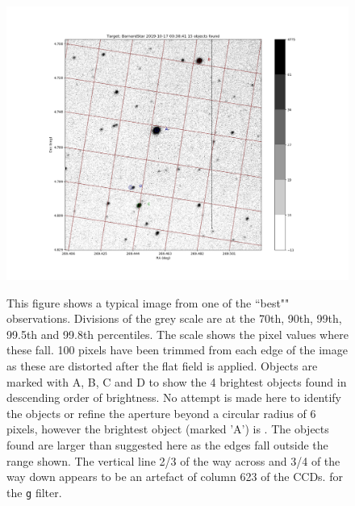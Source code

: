 \begin{figure}[!htbp]
\begin{center}
\includegraphics[scale=0.5]{images/gooddisp.png} \\
\end{center}   
\caption{This figure shows a typical image from one of the ``best"" {\bstar}
observations. Divisions of the grey scale are at the 70th, 90th, 99th, 99.5th
and 99.8th percentiles. The scale shows the pixel values where these fall.
100 pixels have been trimmed from each edge of the image as these are distorted
after the flat field is applied.
Objects are marked with A, B, C and D to show the 4 brightest objects found in descending order of
brightness. No attempt is made here to identify the objects or refine the
aperture beyond a circular radius of 6 pixels, however the brightest object
(marked 'A') is \bstar.
The objects found are larger than suggested here as the edges fall
outside the range shown.
The vertical line 2/3 of the way across and 3/4 of the way down appears to be
an artefact of column 623 of the CCDs. for the \texttt{g} filter.}
\protect\label{fig:goodimage}
\end{figure}
